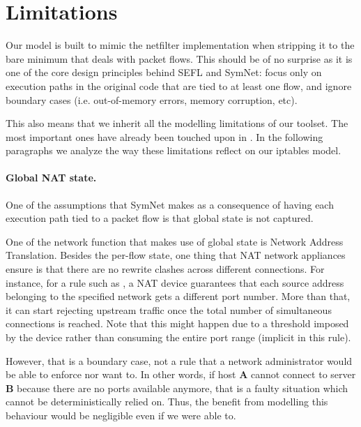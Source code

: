 \section{Limitations}\label{sec:limitations}
Our model is built to mimic the netfilter implementation when stripping it to
the bare minimum that deals with packet flows.  This should be of no surprise
as it is one of the core design principles behind SEFL and SymNet: focus
only on execution paths in the original code that are tied to at least one
flow, and ignore boundary cases (i.e. out-of-memory errors, memory corruption,
etc).

This also means that we inherit all the modelling limitations of our toolset.
The most important ones have already been touched upon in
.  In the following paragraphs we
analyze the way these limitations reflect on our iptables model.

\paragraph{Global NAT state.}
One of the assumptions that SymNet makes as a consequence of having each
execution path tied to a packet flow is that global state is not captured.

One of the network function that makes use of global state is Network Address
Translation.  Besides the per-flow state, one thing that NAT network appliances
ensure is that there are no rewrite clashes across different connections.  For
instance, for a rule such as , a NAT device guarantees that each source address belonging to the
specified network gets a different port number.  More than that, it can start
rejecting upstream traffic once the total number of simultaneous connections is
reached.  Note that this might happen due to a threshold imposed by the device
rather than consuming the entire port range (implicit in this rule).

However, that is a boundary case, not a rule that a network administrator would
be able to enforce nor want to.  In other words, if host \textbf{A} cannot
connect to server \textbf{B} because there are no ports available anymore, that
is a faulty situation which cannot be deterministically relied on.  Thus, the
benefit from modelling this behaviour would be negligible even if we were able
to.

